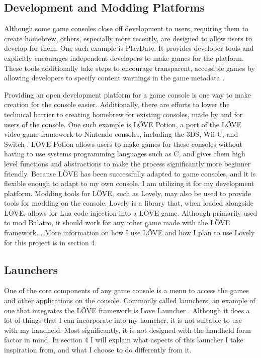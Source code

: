 \documentclass[10pt,twocolumn]{article}
\begin{document}
\subsection{Development and Modding Platforms}

Although some game consoles close off development to users, requiring them to
create homebrew, others, especially more recently, are designed to allow users
to develop for them. One such example is PlayDate. It provides developer tools
and explicitly encourages independent developers to make games for the platform.
These tools additionally take steps to encourage transparent, accessible games
by allowing developers to specify content warnings in the game metadata
\cite{inc_inside_nodate}.

Providing an open development platform for a game console is one way to make
creation for the console easier. Additionally, there are efforts to lower the
technical barrier to creating homebrew for existing consoles, made by and for
users of the console.
One such example is LÖVE Potion, a port of the LÖVE video
game framework to Nintendo consoles, including the 3DS, Wii U, and Switch
\cite{noauthor_lovebrewlovepotion_2025}.
LÖVE Potion allows users to make games
for these consoles without having to use systems programming languages such as
C, and gives them high level functions and abstractions to make the process
significantly more beginner friendly. Because LÖVE
has been successfully adapted
to game consoles, and it is flexible enough to adapt to my own console, I am
utilizing it for my development platform. Modding tools for LÖVE,
such as
Lovely, may also be used to provide tools for modding on the console.
Lovely is a library that, when loaded alongside LÖVE,
allows for Lua code injection into a
LÖVE game. Although primarily used to mod Balatro,
it should work for any other
game made with the LÖVE framework.
\cite{green_ethangreen-devlovely-injector_2025}. More information on how I use
LÖVE and how I plan to use Lovely for this project
is in section 4.

\subsection{Launchers}

One of the core components of any game console is a menu to access the games and
other applications on the console. Commonly called launchers, an example of one
that integrates the LÖVE framework is Love Launcher
\cite{noauthor_glitchapplovelauncher_nodate}. Although it does a lot of things
that I can incorporate into my launcher, it is not suitable to use with
my handheld. Most significantly, it is not designed with the handheld form
factor in mind. In section 4 I will explain what aspects of this launcher I take
inspiration from, and what I choose to do differently from it.
\end{document}
